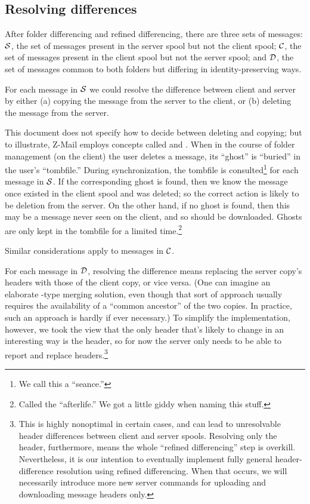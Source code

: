 \subsection{Resolving differences}

After folder differencing and refined differencing, there are three
sets of messages: ${\cal S}$, the set of messages present in the
server spool but not the client spool; ${\cal C}$, the set of
messages present in the client spool but not the server spool; and
${\cal D}$, the set of messages common to both folders but
differing in identity-preserving ways.

For each message in ${\cal S}$ we could resolve the difference
between client and server by either (a) copying the message from the
server to the client, or (b) deleting the message from the server.

This document does not specify how to decide between deleting and
copying; but to illustrate, Z-Mail employs concepts called
 and .  When in the course of folder
management (on the client) the user deletes a message, its ``ghost''
is ``buried'' in the user's ``tombfile.''  During synchronization, the
tombfile is consulted\footnote{We call this a ``seance.''} for each
message in ${\cal S}$.  If the corresponding ghost is found, then
we know the message once existed in the client spool and was deleted;
so the correct action is likely to be deletion from the server.  On
the other hand, if no ghost is found, then this may be a message never
seen on the client, and so should be downloaded.  Ghosts are only kept
in the tombfile for a limited time.\footnote{Called the
``afterlife.''  We got a little giddy when naming this stuff.}

Similar considerations apply to messages in ${\cal C}$.

For each message in ${\cal D}$, resolving the difference means
replacing the server copy's headers with those of the client copy, or
vice versa.  (One can imagine an elaborate -type merging
solution, even though that sort of approach usually requires the
availability of a ``common ancestor'' of the two copies.  In practice,
such an approach is hardly if ever necessary.)  To simplify the
implementation, however, we took the view that the only header that's
likely to change in an interesting way is the  header, so
for now the server only needs to be able to report and replace
 headers.\footnote{This is highly nonoptimal in certain
cases, and can lead to unresolvable header differences between client
and server spools.  Resolving only the  header,
furthermore, means the whole ``refined differencing'' step is
overkill.  Nevertheless, it is our intention to eventually implement
fully general header-difference resolution using refined differencing.
When that occurs, we will necessarily introduce more new server
commands for uploading and downloading message headers only.}

